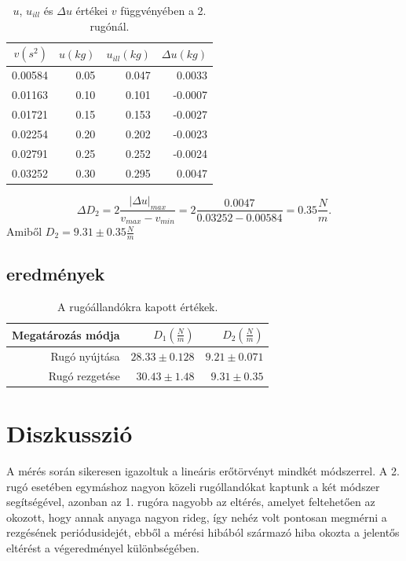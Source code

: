 \documentclass[10pt,pdftex]{report}
\begin{document}
\begin{table}[H]
    \centering
    \begin{tabular}{|r|r|r|r|}
        \hline
        $v(s^2)$ &  $u(kg)$ & $u_{ill}(kg)$ & $\Delta u(kg)$ \\
        \hline
        0.00584 & 0.05 & 0.047 & 0.0033 \\
        \hline
        0.01163 & 0.10 & 0.101 & -0.0007 \\
        \hline
        0.01721 & 0.15 & 0.153 & -0.0027 \\
        \hline
        0.02254 & 0.20 & 0.202 & -0.0023 \\
        \hline
        0.02791 & 0.25 & 0.252 & -0.0024 \\
        \hline
        0.03252 & 0.30 & 0.295 & 0.0047 \\
        \hline
    \end{tabular}
    \caption{$u$, $u_{ill}$ és $\Delta u$ értékei $v$ függvényében a 2. rugónál.}
\end{table}
\begin{equation*}
    \Delta D_2=2\frac{\left|\Delta u\right|_{max}}{v_{max}-v_{min}}=2\frac{0.0047}{0.03252-0.00584}=0.35\frac{N}{m}.
\end{equation*}
Amiből $D_2=9.31\pm0.35\frac{N}{m}$
\subsection*{eredmények}
\begin{table}[H]
    \centering
    \begin{tabular}{|r|r|r|}
        \hline
        Megatározás módja & $D_1\left(\frac{N}{m}\right)$ & $D_2\left(\frac{N}{m}\right)$ \\
        \hline
        Rugó nyújtása & $28.33\pm0.128$ & $9.21\pm 0.071$ \\
        \hline
        Rugó rezgetése & $30.43\pm1.48$ & $9.31\pm0.35$ \\
        \hline
    \end{tabular}
    \caption{A rugóállandókra kapott értékek.}
\end{table}
\section*{Diszkusszió}
A mérés során sikeresen igazoltuk a lineáris erőtörvényt mindkét módszerrel. A 2. rugó esetében egymáshoz nagyon közeli rugóllandókat kaptunk a két módszer segítségével, azonban az 1. rugóra nagyobb az eltérés, amelyet feltehetően az okozott, hogy annak anyaga nagyon rideg, így nehéz volt pontosan megmérni a rezgésének periódusidejét, ebből a mérési hibából származó hiba okozta a jelentős eltérést a végeredményel különbségében.
\end{document}
